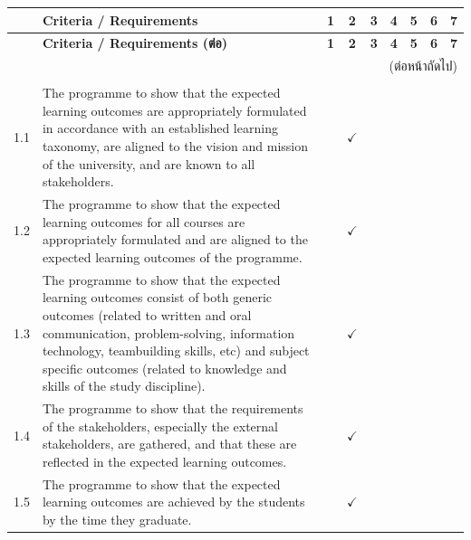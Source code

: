 \begingroup
\scriptsize
\setlength{\tabcolsep}{2pt}
\renewcommand{\arraystretch}{1.2}
\begin{longtable}{|p{0.6cm}|>{\raggedright\arraybackslash}p{9.2cm}|c|c|c|c|c|c|c|}
  \hline
  \rowcolor{gray!20}
  & \textbf{Criteria / Requirements} & \textbf{1} & \textbf{2} & \textbf{3} & \textbf{4} & \textbf{5} & \textbf{6} & \textbf{7} \\
  \hline
  \endfirsthead
  \hline
  \rowcolor{gray!20}
  & \textbf{Criteria / Requirements (ต่อ)} & \textbf{1} & \textbf{2} & \textbf{3} & \textbf{4} & \textbf{5} & \textbf{6} & \textbf{7} \\
  \hline
  \endhead
  \hline
  \multicolumn{9}{r}{\footnotesize (ต่อหน้าถัดไป)} \\
  \endfoot
  \hline
  \endlastfoot

  \multicolumn{9}{|l|}{\cellcolor{gray!15}\textbf{1\quad Expected Learning Outcomes}} \\
  \hline
  1.1 & The programme to show that the expected learning outcomes are appropriately formulated in accordance with an established learning taxonomy, are aligned to the vision and mission of the university, and are known to all stakeholders. & & $\checkmark$ & & & & & \\
  \hline
  1.2 & The programme to show that the expected learning outcomes for all courses are appropriately formulated and are aligned to the expected learning outcomes of the programme. & & $\checkmark$ & & & & & \\
  \hline
  1.3 & The programme to show that the expected learning outcomes consist of both generic outcomes (related to written and oral communication, problem-solving, information technology, teambuilding skills, etc) and subject specific outcomes (related to knowledge and skills of the study discipline). & & $\checkmark$ & & & & & \\
  \hline
  1.4 & The programme to show that the requirements of the stakeholders, especially the external stakeholders, are gathered, and that these are reflected in the expected learning outcomes. & & $\checkmark$ & & & & & \\
  \hline
  1.5 & The programme to show that the expected learning outcomes are achieved by the students by the time they graduate. & & $\checkmark$ & & & & & \\
  \hline


\end{longtable}
